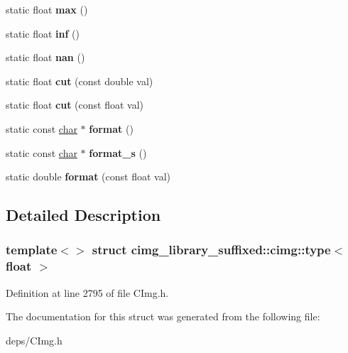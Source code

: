 \begin{DoxyCompactItemize}
static float {\bfseries max} ()
\item 
\mbox{\label{structcimg__library__suffixed_1_1cimg_1_1type_3_01float_01_4_a89b8e71b517e78f30371af6b94034542}} 
static float {\bfseries inf} ()
\item 
\mbox{\label{structcimg__library__suffixed_1_1cimg_1_1type_3_01float_01_4_ac5696859985362db837b405b9ad878db}} 
static float {\bfseries nan} ()
\item 
\mbox{\label{structcimg__library__suffixed_1_1cimg_1_1type_3_01float_01_4_ad607ab6fa2d75e489cac77f4db55b4fd}} 
static float {\bfseries cut} (const double val)
\item 
\mbox{\label{structcimg__library__suffixed_1_1cimg_1_1type_3_01float_01_4_a163d23fab190718791218b3963611fdb}} 
static float {\bfseries cut} (const float val)
\item 
\mbox{\label{structcimg__library__suffixed_1_1cimg_1_1type_3_01float_01_4_a5a94c66ef25d0995e89ff7da84cbf2dd}} 
static const \hyperlink{classchar}{char} $\ast$ {\bfseries format} ()
\item 
\mbox{\label{structcimg__library__suffixed_1_1cimg_1_1type_3_01float_01_4_a6ec3ad12e3058867feb2693e64a588f8}} 
static const \hyperlink{classchar}{char} $\ast$ {\bfseries format\+\_\+s} ()
\item 
\mbox{\label{structcimg__library__suffixed_1_1cimg_1_1type_3_01float_01_4_ac48181eb4c1deecf1a2f8258f329eacd}} 
static double {\bfseries format} (const float val)
\end{DoxyCompactItemize}


\subsection{Detailed Description}
\subsubsection*{template$<$$>$\newline
struct cimg\+\_\+library\+\_\+suffixed\+::cimg\+::type$<$ float $>$}



Definition at line 2795 of file C\+Img.\+h.



The documentation for this struct was generated from the following file\+:\begin{DoxyCompactItemize}
\item 
deps/C\+Img.\+h\end{DoxyCompactItemize}
